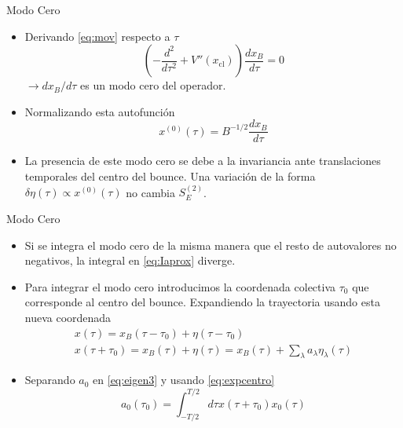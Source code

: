 \documentclass{beamer}
\theoremstyle{example}
\theoremstyle{example}
\begin{document}
\begin{frame}{Modo Cero}
\begin{itemize}
    \item Derivando \eqref{eq:mov} respecto a $\tau$ 
    \begin{equation}
        \left( - \frac{d^2}{d\tau^2} + V''(x_{\textrm{cl}})\right) \frac{dx_B}{d\tau} = 0
    \end{equation}
    $\rightarrow dx_B/d\tau$ es un modo cero del operador.
    
    \item Normalizando esta autofunción
    \begin{equation}
        x^{(0)}(\tau) = B^{-1/2}\frac{dx_B}{d\tau}
    \end{equation}
    
    \item La presencia de este modo cero se debe a la invariancia ante translaciones temporales del centro del bounce. Una variación de la forma $\delta \eta(\tau) \propto x^{(0)}(\tau)$ no cambia $S_E^{(2)}$.
\end{itemize}
\end{frame}

\begin{frame}{Modo Cero}
\begin{itemize}
    \item Si se integra el modo cero de la misma manera que el resto de autovalores no negativos, la integral en \eqref{eq:Iaprox} diverge. 
    
    \item Para integrar el modo cero introducimos la coordenada colectiva $\tau_0$ que corresponde al centro del bounce. Expandiendo la trayectoria usando esta nueva coordenada
    \begin{gather} \label{eq:expcentro}
        x(\tau) = x_B(\tau - \tau_0) + \eta (\tau - \tau_0) \\
        x(\tau + \tau_0) = x_B(\tau) + \eta (\tau) = x_B(\tau) + \sum_\lambda a_\lambda \eta_\lambda (\tau)
    \end{gather}
    
    \item Separando $a_0$ en \eqref{eq:eigen3} y usando \eqref{eq:expcentro}
    \begin{equation} \label{eq:a02}
        a_0 (\tau_0) = \int_{-T/2}^{T/2} d\tau x(\tau + \tau_0) x_0(\tau) 
    \end{equation}
\end{itemize}
\end{frame}
\end{document}
